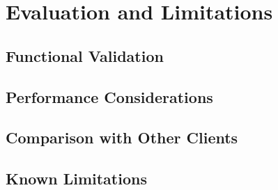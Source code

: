\chapter{Evaluation and Limitations} \label{cap:evaluation}


\section{Functional Validation}
\lipsum[1]


\section{Performance Considerations}
\lipsum[1]


\section{Comparison with Other Clients}
\lipsum[1]


\section{Known Limitations}
\lipsum[1]
